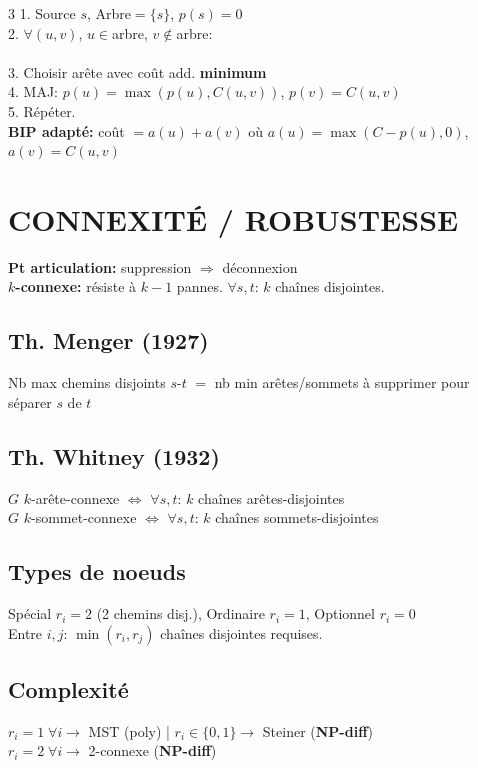 \documentclass[a4paper,4pt]{article}
\begin{document}
\begin{multicols}{3}
1. Source $s$, Arbre$=\{s\}$, $p(s)=0$\\
2. $\forall (u,v)$, $u\in$arbre, $v\notin$arbre:\\
\\
3. Choisir ar\^ete avec co\^ut add. \textbf{minimum}\\
4. MAJ: $p(u)=\max(p(u),C(u,v))$, $p(v)=C(u,v)$\\
5. R\'ep\'eter.\\
\textbf{BIP adapt\'e:} co\^ut $=a(u)+a(v)$ o\`u $a(u)=\max(C-p(u),0)$, $a(v)=C(u,v)$

\section{CONNEXIT\'E / ROBUSTESSE}

\textbf{Pt articulation:} suppression $\Rightarrow$ d\'econnexion\\
\textbf{$k$-connexe:} r\'esiste \`a $k-1$ pannes. $\forall s,t$: $k$ cha\^ines disjointes.

\subsection{Th. Menger (1927)}
{\color{red}Nb max chemins disjoints $s$-$t$ $=$ nb min ar\^etes/sommets \`a supprimer pour s\'eparer $s$ de $t$}

\subsection{Th. Whitney (1932)}
$G$ $k$-ar\^ete-connexe $\Leftrightarrow$ $\forall s,t$: $k$ cha\^ines ar\^etes-disjointes\\
$G$ $k$-sommet-connexe $\Leftrightarrow$ $\forall s,t$: $k$ cha\^ines sommets-disjointes

\subsection{Types de noeuds}
Sp\'ecial $r_i=2$ (2 chemins disj.), Ordinaire $r_i=1$, Optionnel $r_i=0$\\
Entre $i,j$: $\min(r_i,r_j)$ cha\^ines disjointes requises.

\subsection{Complexit\'e}
$r_i=1\;\forall i \to$ MST (poly) | $r_i\in\{0,1\} \to$ Steiner (\textbf{NP-diff})\\
$r_i=2\;\forall i \to$ 2-connexe (\textbf{NP-diff})


\end{multicols}
\end{document}
